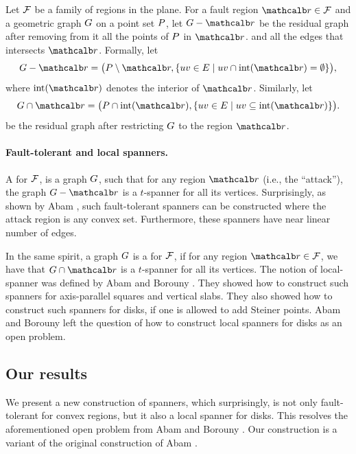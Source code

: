 \documentclass[12pt]{article}%
\begin{document}
{Let $\mathcal{F}$ be a family of regions in the plane. For a fault region
$\region \in \FF$ and a geometric graph $G$ on a point set $P$, let
$\G \gminus \region$ be the residual graph after removing from it all
the points of $P$ in $\region$. and all the edges that intersects
$\region$.  Formally, let
\begin{equation*}
    \G \gminus \region%
    =%
    \bigl( \PS \setminus \region, \Set{ uv \in \EG }{ uv \cap
       \interiorX{\region} = \emptyset} \bigr),
\end{equation*}
where $\interiorX{\region}$ denotes the interior of
$\region$. Similarly, let
\begin{equation*}
    \restrictY{\G}{\region}%
    =%
    \bigl( \PS \cap \interiorX{\region},
    \Set{uv \in \EG}{ uv \subseteq \interiorX{\region} } \bigr).
\end{equation*}
be the residual graph after restricting $G$ to the region $\region$.

\paragraph{Fault-tolerant and local spanners.}

A  for $\mathcal{F}$, is a graph $G$, such that
for any region $\region$ (i.e., the ``attack''), the graph
$\G \gminus \region$ is a $t$-spanner for all its
vertices. Surprisingly, as shown by Abam \etal \cite{abfg-rftgs-09},
such fault-tolerant spanners can be constructed where the attack
region is any convex set. Furthermore, these spanners have near linear
number of edges.

In the same spirit, a graph $G$ is a  for $\mathcal{F}$,
if for any region $\region \in \FF$, we have that
$\restrictY{\G}{\region}$ is a $t$-spanner for all its vertices.  The
notion of local-spanner was defined by Abam and Borouny
\cite{ab-lgs-21}. They showed how to construct such spanners for
axis-parallel squares and vertical slabs. They also showed how to
construct such spanners for disks, if one is allowed to add Steiner
points. Abam and Borouny left the question of how to construct local
spanners for disks as an open problem.

\subsection*{Our results}

We present a new construction of spanners, which surprisingly, is not
only fault-tolerant for convex regions, but it also a local spanner
for disks. This resolves the aforementioned open problem from Abam and
Borouny \cite{ab-lgs-21}. Our construction is a variant of the
original construction of Abam \etal \cite{abfg-rftgs-09}.

}
\end{document}
